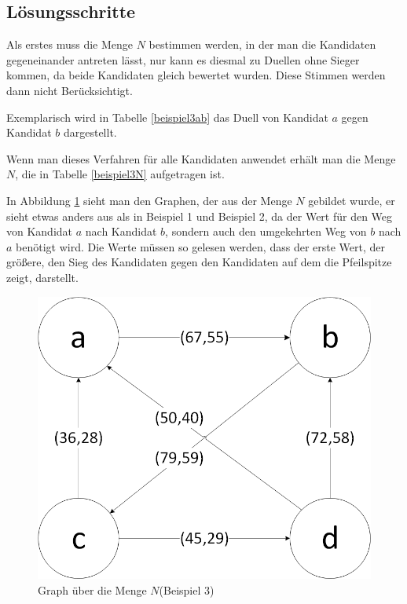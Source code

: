 \subsection{Lösungsschritte} 
\label{sec:loesungen3}
Als erstes muss die Menge $N$ bestimmen werden, in der man die Kandidaten gegeneinander antreten lässt, nur kann es diesmal zu Duellen ohne Sieger kommen, da beide Kandidaten gleich bewertet wurden. Diese Stimmen werden dann nicht Berücksichtigt. 

Exemplarisch wird in Tabelle \ref{beispiel3ab} das Duell von Kandidat $a$ gegen Kandidat $b$ dargestellt. 




Wenn man dieses Verfahren für alle Kandidaten anwendet erhält man die Menge $N$, die in Tabelle \ref{beispiel3N} aufgetragen ist.



In Abbildung \ref{fig:graph3} sieht man den Graphen, der aus der Menge $N$ gebildet wurde, er sieht etwas anders aus als in Beispiel 1 und Beispiel 2, da der Wert für den Weg von Kandidat $a$ nach Kandidat $b$, sondern auch den umgekehrten Weg von $b$ nach $a$ benötigt wird. Die Werte müssen so gelesen werden, dass der erste Wert, der größere, den Sieg des Kandidaten gegen den Kandidaten auf dem die Pfeilspitze zeigt, darstellt.

\begin{figure}[!h]
\centering
\includegraphics[scale=0.5]{Bilder/Beispiel3_Graph.png}
\caption{Graph über die Menge $N$(Beispiel 3)}
\label{fig:graph3}
\end{figure}

